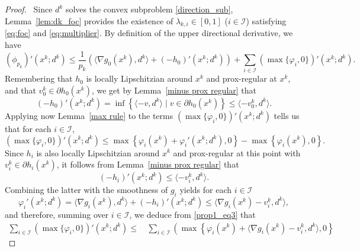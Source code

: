 \documentclass[10pt,a4paper]{amsart}
\begin{document}
\begin{proof}\,
Since $d^k$ solves the convex subproblem \eqref{direction_sub}, Lemma~\ref{lem:dk_foc} provides the existence of $\lambda_{k,i} \in [0,1]$ ($i \in \mathcal{I}$) satisfying \eqref{eq:foc} and \eqref{eq:multiplier}. 
By definition of the upper directional derivative, we have
\begin{equation}\label{prop1_eq1}
  (\phi_{p_k})'(x^k; d^k) 
  \leq \frac{1}{p_k} \left( \langle \nabla g_0(x^k), d^k \rangle + (-h_0)'(x^k; d^k)\right)
  + \sum_{i\in\mathcal I} \left(\max\{\varphi_i, 0\}\right)'(x^k; d^k).
\end{equation}
Remembering that $h_0$ is locally Lipschitzian around $x^k$ and prox-regular at $x^k$, and that $v_0^k \in \partial h_0(x^k)$, we get by Lemma~\ref{minus prox regular} that
\begin{equation}\label{prop1_eq2}
 (-h_0)'(x^k; d^k) = \inf\left\{ \langle -v, d^k \rangle \mid v \in \partial h_0(x^k) \right\} \leq \langle -v_0^k, d^k \rangle.
\end{equation}
Applying now Lemma~\ref{max rule} to the terms $\left(\max\{\varphi_i, 0\}\right)'(x^k; d^k)$ tells us that for each $i \in \mathcal I$,
\begin{equation}\label{prop1_eq3}
 \left(\max\{{\varphi_i}, 0\}\right)'\left(x ^k; d^k\right) \le \max\left\{ {\varphi_i}(x^k) +{\varphi_i}'(x^k; d^k), 0 \right\} - \max\left\{ {\varphi_i}(x^k), 0 \right\}.
\end{equation}
Since $h_i$ is also locally Lipschitzian around $x^k$ and prox-regular at this point with $v_i^k \in \partial h_i(x^k)$, it follows from Lemma~\ref{minus prox regular} that
\begin{equation*}
 (-h_i)'(x^k; d^k)  \leq \langle -v_i^k, d^k \rangle.
\end{equation*}
Combining the latter with the smoothness of {$g_i$} yields for each $i \in \mathcal I$
 \begin{equation*}
   \varphi_i'(x^k; d^k) = \langle \nabla {g_i}(x^k), d^k \rangle + (-h_i)'(x^k; d^k) \le \langle \nabla g_i(x^k) - v_i^k, d^k \rangle,
 \end{equation*}
and therefore, summing over $i\in\mathcal I$, we deduce from \eqref{prop1_eq3} that
\begin{equation}\label{prop1_eq4}
 \begin{aligned}
   \sum_{i\in\mathcal I} \left(\max\{\varphi_i, 0\}\right)'\left(x^k; d^k\right) \leq\, &\sum_{i\in\mathcal I} \left( \max\left\{ \varphi_i(x^k) + \langle \nabla g_i(x^k) - v_i^k, d^k \rangle, 0 \right\} 

\end{aligned}
\end{equation}
\end{proof}
\end{document}
